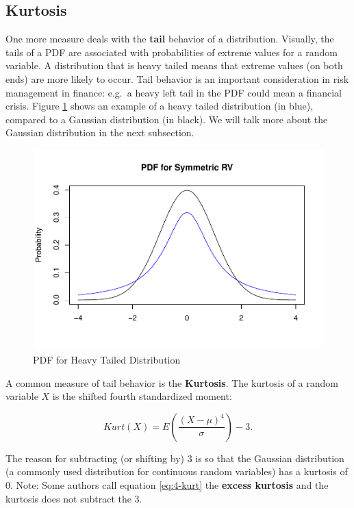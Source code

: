 \documentclass[
]{book}
\begin{document}
\subsection{Kurtosis}\label{kurtosis}

One more measure deals with the \textbf{tail} behavior of a distribution. Visually, the tails of a PDF are associated with probabilities of extreme values for a random variable. A distribution that is heavy tailed means that extreme values (on both ends) are more likely to occur. Tail behavior is an important consideration in risk management in finance: e.g.~a heavy left tail in the PDF could mean a financial crisis. Figure \ref{fig:4-kurt} shows an example of a heavy tailed distribution (in blue), compared to a Gaussian distribution (in black). We will talk more about the Gaussian distribution in the next subsection.

\begin{figure}
\centering
\includegraphics{bookdown-demo_files/figure-latex/4-kurt-1.pdf}
\caption{\label{fig:4-kurt}PDF for Heavy Tailed Distribution}
\end{figure}

A common measure of tail behavior is the \textbf{Kurtosis}. The kurtosis of a random variable \(X\) is the shifted fourth standardized moment:

\begin{equation} 
Kurt(X) = E \left(\frac{(X-\mu)^4}{\sigma} \right) - 3.
\label{eq:4-kurt}
\end{equation}

The reason for subtracting (or shifting by) 3 is so that the Gaussian distribution (a commonly used distribution for continuous random variables) has a kurtosis of 0. Note: Some authors call equation \eqref{eq:4-kurt} the \textbf{excess kurtosis} and the kurtosis does not subtract the 3.
\end{document}
